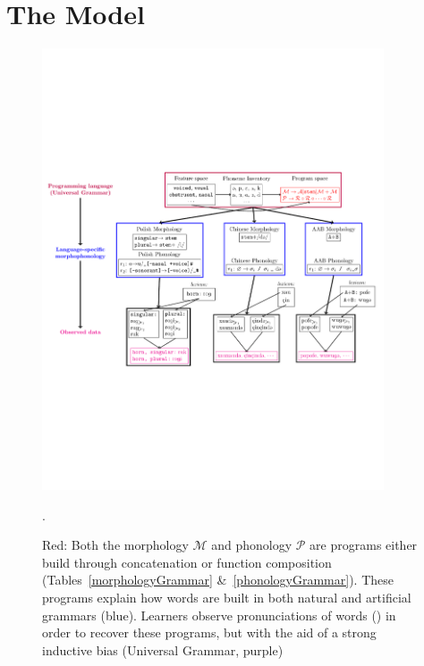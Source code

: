 \documentclass{article}
\begin{document}




\section{The Model}

\begin{figure}[h!]\centering
  \includegraphics[width = 0.9\textwidth]{generativeModel.pdf}
  \caption{{\color{red}Red}: Both the morphology $\mathcal{M}$ and
    phonology $\mathcal{P}$ are programs either build through
    concatenation or function composition
    (Tables~\ref{morphologyGrammar} \&~\ref{phonologyGrammar}). These programs explain how words are built in both natural and artificial grammars ({\color{blue}blue}). Learners observe pronunciations of words ({\color{magenta}}) in order to recover these programs, but with the aid of a strong inductive bias (Universal Grammar, {\color{purple}purple})}.
  \label{beautiful}
\end{figure}
\end{document}
